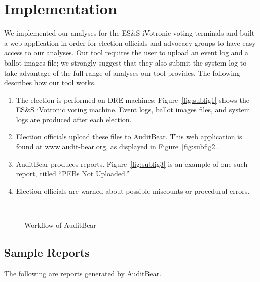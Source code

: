 \section{Implementation}
We implemented our analyses for the ES\&S iVotronic voting terminals and built a web application in order for election officials and advocacy groups to have easy access to our analyses.  Our tool requires the user to upload an event log and a ballot images file; we strongly suggest that they also submit the system log to take advantage of the full range of analyses our tool provides.  The following describes how our tool works.  

\begin{enumerate}
\item
The election is performed on DRE machines; Figure~\ref{fig:subfig1} shows the ES\&S iVotronic voting machine.  Event logs, ballot images files, and system logs are produced after each election.
\item
Election officials upload these files to AuditBear.  This web application is found at www.audit-bear.org, as displayed in Figure~\ref{fig:subfig2}.  
\item
AuditBear produces reports.  Figure~\ref{fig:subfig3} is an example of one such report, titled \textquotedblleft PEBs Not Uploaded.\textquotedblright
\item
Election officials are warned about possible miscounts or procedural errors. 
\end{enumerate}

\begin{figure}[h]
\centering
\mbox{
}
\caption{Workflow of AuditBear}
\label{auditBear}
\end{figure}




\subsection{Sample Reports}
The following are reports generated by AuditBear.  

